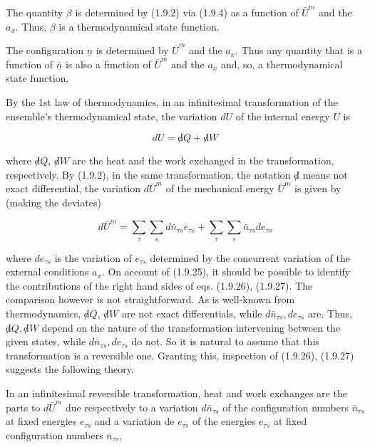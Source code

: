 \documentclass{article}
\begin{document}
The quantity $\beta$ is determined by (1.9.2) via (1.9.4) as a function of $\bar{U}^{m}$ and the $a_{x}$. Thus, $\beta$ is a thermodynamical state function.

The configuration $\underline{n}$ is determined by $\bar{U}^{m}$ and the $a_{x}$. Thus any quantity that is a function of $\underline{\bar{n}}$ is also a function of $\bar{U}^{m}$ and the $a_{x}$ and, so, a thermodynamical state function.

By the 1st law of thermodynamics, in an infinitesimal transformation of the ensemble's thermodynamical state, the variation $d U$ of the internal energy $U$ is

\begin{equation}
d U=\not d Q+\not d W \tag{1.9.26}
\end{equation}

where $\not d Q$, $\not d W$ are the heat and the work exchanged in the transformation, respectively. By (1.9.2), in the same transformation, the notation $\not d$ means not exact differential, the variation $d \bar{U}^{m}$ of the mechanical energy $\bar{U}^{m}$ is given by (making the deviates)

\begin{equation}
d \bar{U}^{m}=\sum_{\tau} \sum_{s} d \bar{n}_{\tau s} e_{\tau s}+\sum_{\tau} \sum_{s} \bar{n}_{\tau s} d e_{\tau s} \tag{1.9.27}
\end{equation}

where $d e_{\tau s}$ is the variation of $e_{\tau s}$ determined by the concurrent variation of the external conditions $a_{x}$. On account of (1.9.25), it should be possible to identify the contributions of the right hand sides of eqs. (1.9.26), (1.9.27). The comparison however is not straightforward. As is well-known from thermodynamics, $\not d Q$, $\not d W$ are not exact differentials, while $d \bar{n}_{\tau s}, d e_{\tau s}$ are. Thus, $\not d Q, \not d W$ depend on the nature of the transformation intervening between the given states, while $d \bar{n}_{\tau s}, d e_{\tau s}$ do not. So it is natural to assume that this transformation is a reversible one. Granting this, inspection of (1.9.26), (1.9.27) suggests the following theory.

In an infinitesimal reversible transformation, heat and work exchanges are the parts to $d \bar{U}^{m}$ due respectively to a variation $d \bar{n}_{\tau s}$ of the configuration numbers $\bar{n}_{\tau s}$ at fixed energies $e_{\tau s}$ and a variation de $e_{\tau s}$ of the energies $e_{\tau s}$ at fixed configuration numbers $\bar{n}_{\tau s}$,
\end{document}
